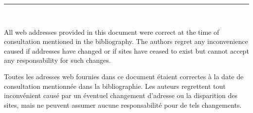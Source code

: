	\rule{\textwidth}{5pt}
	\thispagestyle{empty}
	\vspace{1pt}
	\begin{minipage}{0.6\textwidth}
		
		\vspace{15cm}
		\textcolor{white}{text}
	\end{minipage}
	\begin{minipage}{0.4\textwidth}
		{\small 
		All web addresses provided in this document were correct at the time of consultation mentioned in the bibliography. The authors regret any inconvenience caused if addresses have changed or if sites have ceased to exist but cannot accept any responsability for such changes.
		
		\vspace{1cm}
		
		Toutes les adresses web fournies dans ce document \'etaient correctes \`a la date de consultation mentionn\'ee dans la bibliographie. Les auteurs regrettent tout inconv\'enient caus\'e par un \'eventuel changement d'adresse ou la disparition des sites, mais ne peuvent assumer aucune responsabilit\'e pour de tels changements.
		}
		\vspace*{\fill}
	\end{minipage}

	\vspace{3cm}